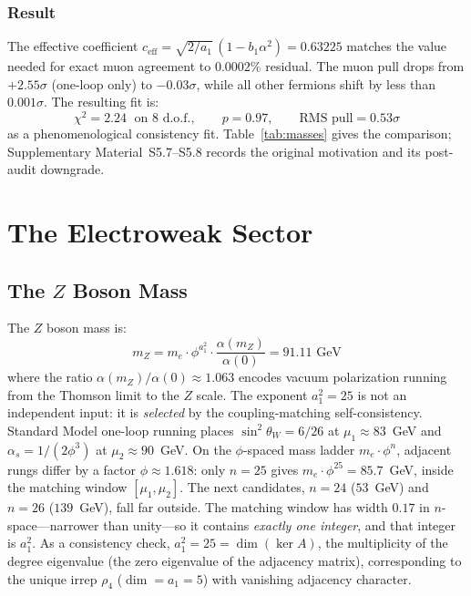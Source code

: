 \documentclass[12pt,a4paper]{article}
\theoremstyle{definition}
\begin{document}
\subsubsection*{Result}

The effective coefficient $c_{\mathrm{eff}} = \sqrt{2/a_1}\,(1 - b_1\alpha^2) = 0.63225$ matches the value needed for exact muon agreement to $0.0002\%$ residual.  The muon pull drops from $+2.55\sigma$ (one-loop only) to $-0.03\sigma$, while all other fermions shift by less than $0.001\sigma$.  The resulting fit is:
\begin{equation}
\chi^2 = 2.24 \;\text{ on 8 d.o.f.}, \qquad p = 0.97, \qquad \text{RMS pull} = 0.53\sigma
\label{eq:chi2_vertex}
\end{equation}
as a phenomenological consistency fit.  Table~\ref{tab:masses} gives the comparison; Supplementary Material~S5.7--S5.8 records the original motivation and its post-audit downgrade.


\section{The Electroweak Sector}
\label{sec:ew}

\subsection{The \texorpdfstring{$Z$}{Z} Boson Mass}

The $Z$ boson mass is:
\begin{equation}
\boxed{m_Z = m_e \cdot \phi^{a_1^2} \cdot \frac{\alpha(m_Z)}{\alpha(0)} = 91.11 \text{ GeV}}
\label{eq:mz}
\end{equation}
where the ratio $\alpha(m_Z)/\alpha(0) \approx 1.063$ encodes vacuum polarization running from the Thomson limit to the $Z$ scale.  The exponent $a_1^2 = 25$ is not an independent input: it is \emph{selected} by the coupling-matching self-consistency.  Standard Model one-loop running places $\sin^2\theta_W = 6/26$ at $\mu_1 \approx 83$~GeV and $\alpha_s = 1/(2\phi^3)$ at $\mu_2 \approx 90$~GeV.  On the $\phi$-spaced mass ladder $m_e \cdot \phi^n$, adjacent rungs differ by a factor $\phi \approx 1.618$: only $n = 25$ gives $m_e \cdot \phi^{25} = 85.7$~GeV, inside the matching window $[\mu_1, \mu_2]$.  The next candidates, $n = 24$ ($53$~GeV) and $n = 26$ ($139$~GeV), fall far outside.  The matching window has width $0.17$ in $n$-space---narrower than unity---so it contains \emph{exactly one integer}, and that integer is $a_1^2$.  As a consistency check, $a_1^2 = 25 = \dim(\ker A)$, the multiplicity of the degree eigenvalue (the zero eigenvalue of the adjacency matrix), corresponding to the unique irrep $\rho_4$ ($\dim = a_1 = 5$) with vanishing adjacency character.
\end{document}
